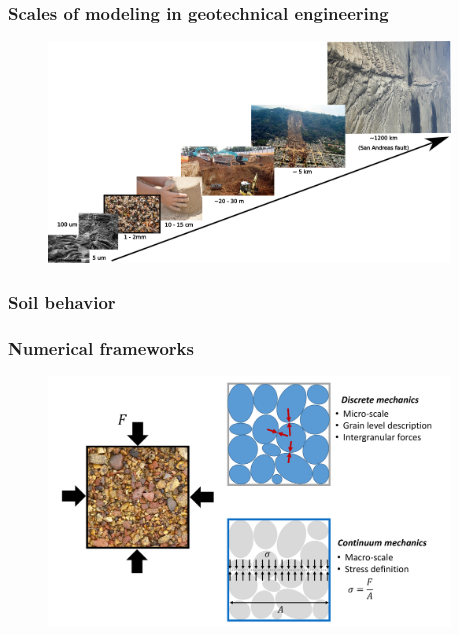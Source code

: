 \documentclass[notes]{beamer}
\begin{document}
\begin{frame}
\frametitle{Scales of modeling in geotechnical engineering}
	\begin{figure}
		\includegraphics[width=0.95\textwidth]{figs/soil-scale.png}
	\end{figure}
\end{frame}

\begin{frame}
\frametitle{Soil behavior}
\end{frame}


\begin{frame}
	\frametitle{Numerical frameworks}
	\begin{figure}
		\includegraphics[width=0.95\textwidth]{figs/numerical-frameworks.png}
	\end{figure}
\end{frame}
\end{document}
